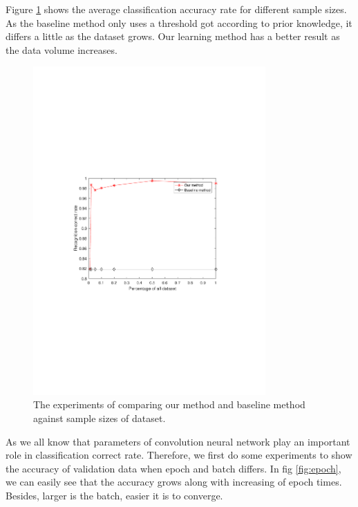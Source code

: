 Figure \ref{fig:sizes} shows the average classification accuracy rate for different sample sizes. As the baseline method only uses a threshold got according to prior knowledge, it differs a little as the dataset grows. Our learning method has a better result as the data volume increases.
\begin{figure}[!t]
	\centering
	\includegraphics[width=3.5in]{figures/sizes}
	\caption{The experiments of comparing our method and baseline method against sample sizes of dataset.}
	\label{fig:sizes}
\end{figure}
As we all know that parameters of convolution neural network play an important role in classification correct rate. Therefore, we first do some experiments to show the accuracy of validation data when epoch and batch differs. In fig \ref{fig:epoch}, we can easily see that the accuracy grows along with increasing of epoch times. Besides, larger is the batch, easier it is to converge.
